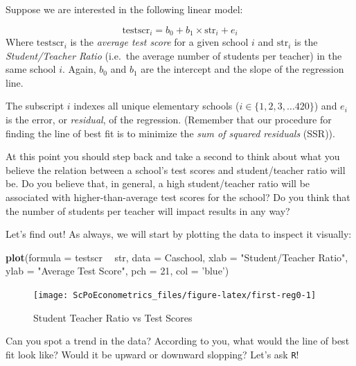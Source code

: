 \documentclass[]{book}
\newenvironment{Shaded}{\begin{snugshade}}{\end{snugshade}}
\newcommand{\KeywordTok}[1]{\textcolor[rgb]{0.13,0.29,0.53}{\textbf{#1}}}
\newcommand{\DataTypeTok}[1]{\textcolor[rgb]{0.13,0.29,0.53}{#1}}
\newcommand{\DecValTok}[1]{\textcolor[rgb]{0.00,0.00,0.81}{#1}}
\newcommand{\StringTok}[1]{\textcolor[rgb]{0.31,0.60,0.02}{#1}}
\newcommand{\OperatorTok}[1]{\textcolor[rgb]{0.81,0.36,0.00}{\textbf{#1}}}
\newcommand{\NormalTok}[1]{#1}
\theoremstyle{definition}
\theoremstyle{definition}
\theoremstyle{definition}
\theoremstyle{remark}
\begin{document}
Suppose we are interested in the following linear model:

\[\text{testscr}_i = b_0 + b_1 \times \text{str}_i + e_i\] Where
\(\text{testscr}_i\) is the \emph{average test score} for a given school
\(i\) and \(\text{str}_i\) is the \emph{Student/Teacher Ratio} (i.e.~the
average number of students per teacher) in the same school \(i\). Again,
\(b_0\) and \(b_1\) are the intercept and the slope of the regression
line.

The subscript \(i\) indexes all unique elementary schools
(\(i \in \{1, 2, 3, \dots 420\}\)) and \(e_i\) is the error, or
\emph{residual}, of the regression. (Remember that our procedure for
finding the line of best fit is to minimize the \emph{sum of squared
residuals} (SSR)).

At this point you should step back and take a second to think about what
you believe the relation between a school's test scores and
student/teacher ratio will be. Do you believe that, in general, a high
student/teacher ratio will be associated with higher-than-average test
scores for the school? Do you think that the number of students per
teacher will impact results in any way?

Let's find out! As always, we will start by plotting the data to inspect
it visually:

\begin{Shaded}
\begin{Highlighting}[]
\KeywordTok{plot}\NormalTok{(}\DataTypeTok{formula =}\NormalTok{ testscr }\OperatorTok{~}\StringTok{ }\NormalTok{str,}
     \DataTypeTok{data =}\NormalTok{ Caschool,}
     \DataTypeTok{xlab =} \StringTok{"Student/Teacher Ratio"}\NormalTok{,}
     \DataTypeTok{ylab =} \StringTok{"Average Test Score"}\NormalTok{, }\DataTypeTok{pch =} \DecValTok{21}\NormalTok{, }\DataTypeTok{col =} \StringTok{'blue'}\NormalTok{)}
\end{Highlighting}
\end{Shaded}

\begin{figure}

{\centering \texttt{[image: ScPoEconometrics\_files/figure-latex/first-reg0-1]} 

}

\caption{Student Teacher Ratio vs Test Scores}\label{fig:first-reg0}
\end{figure}

Can you spot a trend in the data? According to you, what would the line
of best fit look like? Would it be upward or downward slopping? Let's
ask \texttt{R}!
\end{document}
